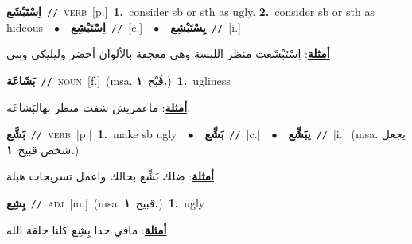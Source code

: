 \documentclass[10pt,a4paper,twoside]{article} %
\begin{document}
\begin{multicols}{2}
{\setlength\topsep{0pt}\textbf{\foreignlanguage{arabic}{اِسْتَبْشَع}}\ {\color{gray}\texttt{//}\color{black}}\ \textsc{verb}\ [p.]\ \textbf{1.}~consider sb or sth as ugly.  \textbf{2.}~consider sb or sth as hideous\ \ $\bullet$\ \ \setlength\topsep{0pt}\textbf{\foreignlanguage{arabic}{اِسْتَبْشِع}}\ {\color{gray}\texttt{//}\color{black}}\ [c.]\ \ $\bullet$\ \ \setlength\topsep{0pt}\textbf{\foreignlanguage{arabic}{يِسْتَبْشِع}}\ {\color{gray}\texttt{//}\color{black}}\ [i.]\  \begin{flushright}\color{gray}\foreignlanguage{arabic}{\textbf{\underline{\foreignlanguage{arabic}{أمثلة}}}: اِسْتَبْشَعت منظر اللبسة وهي معجقة بالألوان أخضر وليليكي وبني}\end{flushright}\color{black}} \vspace{2mm}

{\setlength\topsep{0pt}\textbf{\foreignlanguage{arabic}{بَشَاعَة}}\ {\color{gray}\texttt{//}\color{black}}\ \textsc{noun}\ [f.]\ \color{gray}(msa. \foreignlanguage{arabic}{قُبْح}~\foreignlanguage{arabic}{\textbf{١.}})\color{black}\ \textbf{1.}~ugliness\  \begin{flushright}\color{gray}\foreignlanguage{arabic}{\textbf{\underline{\foreignlanguage{arabic}{أمثلة}}}: ماعمريش شفت منظر بهالبَشاعَة.}\end{flushright}\color{black}} \vspace{2mm}

{\setlength\topsep{0pt}\textbf{\foreignlanguage{arabic}{بَشَّع}}\ {\color{gray}\texttt{//}\color{black}}\ \textsc{verb}\ [p.]\ \textbf{1.}~make sb ugly\ \ $\bullet$\ \ \setlength\topsep{0pt}\textbf{\foreignlanguage{arabic}{بَشِّع}}\ {\color{gray}\texttt{//}\color{black}}\ [c.]\ \ $\bullet$\ \ \setlength\topsep{0pt}\textbf{\foreignlanguage{arabic}{يبَشِّع}}\ {\color{gray}\texttt{//}\color{black}}\ [i.]\ \color{gray}(msa. \foreignlanguage{arabic}{يجعل شخص قبيح}~\foreignlanguage{arabic}{\textbf{١.}})\color{black}\  \begin{flushright}\color{gray}\foreignlanguage{arabic}{\textbf{\underline{\foreignlanguage{arabic}{أمثلة}}}: ضلك بَشِّع بحالك واعمل تسريحات هبلة}\end{flushright}\color{black}} \vspace{2mm}

{\setlength\topsep{0pt}\textbf{\foreignlanguage{arabic}{بِشِع}}\ {\color{gray}\texttt{//}\color{black}}\ \textsc{adj}\ [m.]\ \color{gray}(msa. \foreignlanguage{arabic}{قبيح}~\foreignlanguage{arabic}{\textbf{١.}})\color{black}\ \textbf{1.}~ugly\  \begin{flushright}\color{gray}\foreignlanguage{arabic}{\textbf{\underline{\foreignlanguage{arabic}{أمثلة}}}: مافي حدا بِشِع كلنا خلقة الله}\end{flushright}\color{black}} \vspace{2mm}


\end{multicols}
\end{document}
